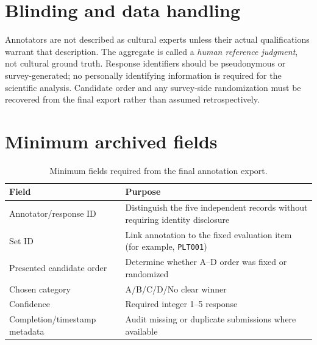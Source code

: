 \section*{Blinding and data handling}
Annotators are not described as cultural experts unless their actual qualifications warrant that description. The aggregate is called a \emph{human reference judgment}, not cultural ground truth. Response identifiers should be pseudonymous or survey-generated; no personally identifying information is required for the scientific analysis. Candidate order and any survey-side randomization must be recovered from the final export rather than assumed retrospectively.

\section*{Minimum archived fields}
\begin{table}[htbp]
\centering
\footnotesize
\caption{Minimum fields required from the final annotation export.}
\label{tab:annotation-export-schema}
\begin{tabularx}{\textwidth}{p{3.4cm}X}
\toprule
\textbf{Field} & \textbf{Purpose} \\
\midrule
Annotator/response ID & Distinguish the five independent records without requiring identity disclosure \\
Set ID & Link annotation to the fixed evaluation item (for example, \texttt{PLT001}) \\
Presented candidate order & Determine whether A--D order was fixed or randomized \\
Chosen category & A/B/C/D/No clear winner \\
Confidence & Required integer 1--5 response \\
Completion/timestamp metadata & Audit missing or duplicate submissions where available \\
\bottomrule
\end{tabularx}
\end{table}

